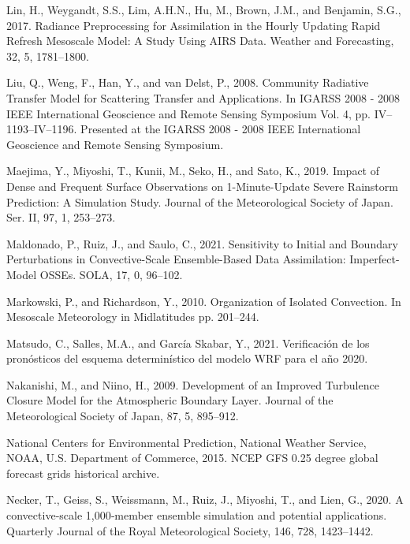 \documentclass[12pt,oneside]{reedthesis}
\begin{document}
\leavevmode\hypertarget{ref-lin2017a}{}%
Lin, H., Weygandt, S.S., Lim, A.H.N., Hu, M., Brown, J.M., and Benjamin, S.G., 2017. Radiance Preprocessing for Assimilation in the Hourly Updating Rapid Refresh Mesoscale Model: A Study Using AIRS Data. Weather and Forecasting, 32, 5, 1781--1800.

\leavevmode\hypertarget{ref-liu2008}{}%
Liu, Q., Weng, F., Han, Y., and van Delst, P., 2008. Community Radiative Transfer Model for Scattering Transfer and Applications. In IGARSS 2008 - 2008 IEEE International Geoscience and Remote Sensing Symposium Vol. 4, pp. IV--1193--IV--1196. Presented at the IGARSS 2008 - 2008 IEEE International Geoscience and Remote Sensing Symposium.

\leavevmode\hypertarget{ref-maejima2019}{}%
Maejima, Y., Miyoshi, T., Kunii, M., Seko, H., and Sato, K., 2019. Impact of Dense and Frequent Surface Observations on 1-Minute-Update Severe Rainstorm Prediction: A Simulation Study. Journal of the Meteorological Society of Japan. Ser. II, 97, 1, 253--273.

\leavevmode\hypertarget{ref-maldonado2021}{}%
Maldonado, P., Ruiz, J., and Saulo, C., 2021. Sensitivity to Initial and Boundary Perturbations in Convective-Scale Ensemble-Based Data Assimilation: Imperfect-Model OSSEs. SOLA, 17, 0, 96--102.

\leavevmode\hypertarget{ref-markowski2010}{}%
Markowski, P., and Richardson, Y., 2010. Organization of Isolated Convection. In Mesoscale Meteorology in Midlatitudes pp. 201--244.

\leavevmode\hypertarget{ref-matsudo2021}{}%
Matsudo, C., Salles, M.A., and García Skabar, Y., 2021. Verificación de los pronósticos del esquema determinístico del modelo WRF para el año 2020.

\leavevmode\hypertarget{ref-nakanishi2009}{}%
Nakanishi, M., and Niino, H., 2009. Development of an Improved Turbulence Closure Model for the Atmospheric Boundary Layer. Journal of the Meteorological Society of Japan, 87, 5, 895--912.

\leavevmode\hypertarget{ref-cisl_rda_ds084.1}{}%
National Centers for Environmental Prediction, National Weather Service, NOAA, U.S. Department of Commerce, 2015. NCEP GFS 0.25 degree global forecast grids historical archive.

\leavevmode\hypertarget{ref-necker2020}{}%
Necker, T., Geiss, S., Weissmann, M., Ruiz, J., Miyoshi, T., and Lien, G., 2020. A convective‐scale 1,000‐member ensemble simulation and potential applications. Quarterly Journal of the Royal Meteorological Society, 146, 728, 1423--1442.
\end{document}
